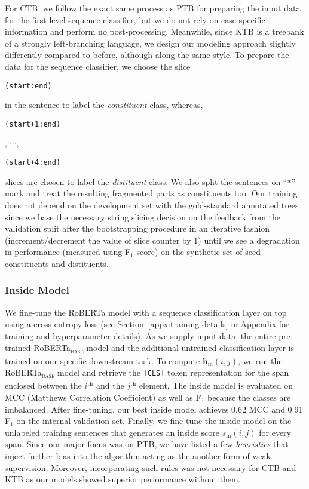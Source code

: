 \documentclass[11pt]{article}
\newcommand{\ptb}{\textsc{PTB}}
\newcommand{\ctb}{\textsc{CTB}}
\newcommand{\ktb}{\textsc{KTB}}
\newcommand{\roberta}{RoBERTa}
\begin{document}
For \ctb{}, we follow the exact same process as \ptb{} for preparing the input data for the first-level sequence classifier, but we do not rely on case-specific information and perform no post-processing. Meanwhile, since \ktb{} is a treebank of a strongly left-branching language, we design our modeling approach slightly differently compared to before, although along the same style. To prepare the data for the sequence classifier, we choose the slice \begin{small}\texttt{(start:end)}\end{small} in the sentence to label the \emph{constituent} class, whereas, \begin{small}{\texttt{(start+1:end)}}\end{small}, $\cdots$, \begin{small}{\texttt{(start+4:end)}}\end{small} slices are chosen to label the \emph{distituent} class. We also split the sentences on ``\texttt{*}'' mark and treat the resulting fragmented parts as constituents too. Our training does not depend on the development set with the gold-standard annotated trees since we base the necessary string slicing decision on the feedback from the validation split after the bootstrapping procedure in an iterative fashion (increment/decrement the value of slice counter by 1) until we see a degradation in performance (measured using F$_1$ score) on the synthetic set of seed constituents and distituents.



\subsubsection{Inside Model}
\label{ssec:inside-model-prepare}

We fine-tune the \roberta{} model with a sequence classification layer on top using a cross-entropy loss (see Section~\ref{appx:training-details} in Appendix for training and hyperparameter details). As we supply input data, the entire pre-trained \roberta{}\textsubscript{\textsc{base}} model and the additional untrained classification layer is trained on our specific downstream task. To compute $\boldsymbol{h}_{\text{in}}{(i, j)}$, we run the \roberta{}\textsubscript{\textsc{base}} model and retrieve the \texttt{[CLS]} token representation for the span enclosed between the $i^{\text{th}}$ and the $j^{\text{th}}$ element. The inside model is evaluated on MCC (Matthews Correlation Coefficient) as well as F$_1$ because the classes are imbalanced. After fine-tuning, our best inside model achieves 0.62 MCC and 0.91 F$_1$ on the internal validation set. Finally, we fine-tune the inside model on the unlabeled training sentences that generates an inside score $s_{\text{in}}{(i,j)}$ for every span. Since our major focus was on \ptb{}, we have listed a few \emph{heuristics} that inject further bias into the algorithm acting as the another form of weak supervision. Moreover, incorporating such rules was not necessary for \ctb{} and \ktb{} as our models showed superior performance without them.
\end{document}
